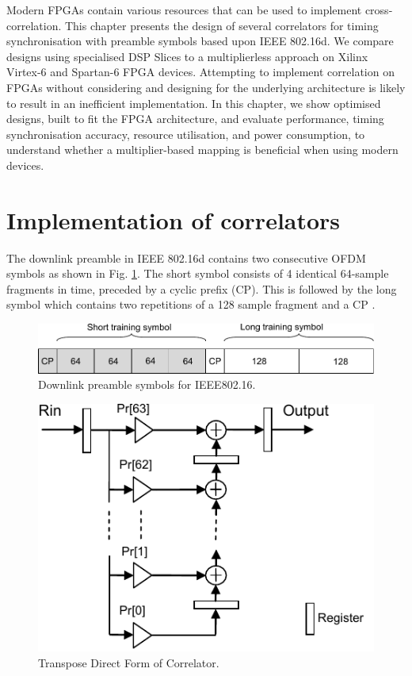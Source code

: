 Modern FPGAs contain various resources that can be used to implement cross-correlation.
This chapter presents the design of several correlators for timing synchronisation with preamble symbols based upon IEEE 802.16d. 
We compare designs using specialised DSP Slices to a multiplierless approach on Xilinx Virtex-6 and Spartan-6 FPGA devices. 
Attempting to implement correlation on FPGAs without considering and designing for the underlying architecture is likely to result in an inefficient implementation.
In this chapter, we show optimised designs, built to fit the FPGA architecture, and evaluate performance, timing synchronisation accuracy, resource utilisation, and power consumption, to understand whether a multiplier-based mapping is beneficial when using modern devices. 
\section{Implementation of correlators}

The downlink preamble in IEEE 802.16d \cite{IEEE80216} contains two consecutive OFDM symbols as shown in Fig. \ref{fig:pre}.  
The short symbol consists of 4 identical 64-sample fragments in time, preceded by a cyclic prefix (CP). 
This is followed by the long symbol which contains two repetitions of a 128 sample fragment and a CP \cite{IEEE80216}. 

\begin{figure}
	\centerline{\includegraphics [width=0.7\columnwidth] {figures/Preamble.pdf} }
	\caption{Downlink preamble symbols for IEEE802.16.}
	\label{fig:pre}
\end{figure}

\begin{figure}
	\centerline{\includegraphics [width=0.5\columnwidth] {figures/structure_correlator.pdf} }
	\caption{Transpose Direct Form of Correlator.}
	\label{fig:str_corr}
\end{figure}


